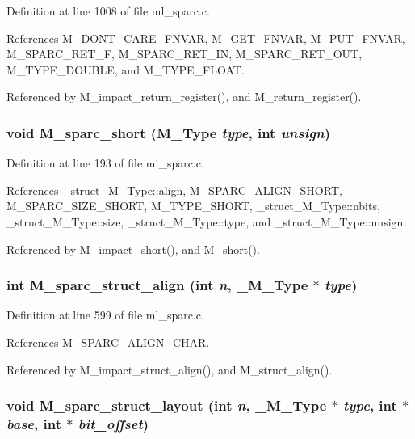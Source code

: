 Definition at line 1008 of file ml\_\-sparc.c.

References M\_\-DONT\_\-CARE\_\-FNVAR, M\_\-GET\_\-FNVAR, M\_\-PUT\_\-FNVAR, M\_\-SPARC\_\-RET\_\-F, M\_\-SPARC\_\-RET\_\-IN, M\_\-SPARC\_\-RET\_\-OUT, M\_\-TYPE\_\-DOUBLE, and M\_\-TYPE\_\-FLOAT.

Referenced by M\_\-impact\_\-return\_\-register(), and M\_\-return\_\-register().
\subsubsection{\setlength{\rightskip}{0pt plus 5cm}void M\_\-sparc\_\-short (\bf{M\_\-Type} {\em type}, int {\em unsign})}\label{m__sparc_8h_a546df12ac7074d2ad2c38f89eab877a}




Definition at line 193 of file mi\_\-sparc.c.

References \_\-struct\_\-M\_\-Type::align, M\_\-SPARC\_\-ALIGN\_\-SHORT, M\_\-SPARC\_\-SIZE\_\-SHORT, M\_\-TYPE\_\-SHORT, \_\-struct\_\-M\_\-Type::nbits, \_\-struct\_\-M\_\-Type::size, \_\-struct\_\-M\_\-Type::type, and \_\-struct\_\-M\_\-Type::unsign.

Referenced by M\_\-impact\_\-short(), and M\_\-short().
\subsubsection{\setlength{\rightskip}{0pt plus 5cm}int M\_\-sparc\_\-struct\_\-align (int {\em n}, \bf{\_\-M\_\-Type} $\ast$ {\em type})}\label{m__sparc_8h_c9dd4fff1abb70ca0f5e44c04bfec38b}




Definition at line 599 of file ml\_\-sparc.c.

References M\_\-SPARC\_\-ALIGN\_\-CHAR.

Referenced by M\_\-impact\_\-struct\_\-align(), and M\_\-struct\_\-align().
\subsubsection{\setlength{\rightskip}{0pt plus 5cm}void M\_\-sparc\_\-struct\_\-layout (int {\em n}, \bf{\_\-M\_\-Type} $\ast$ {\em type}, int $\ast$ {\em base}, int $\ast$ {\em bit\_\-offset})}\label{m__sparc_8h_9ae9119fcdd7f6449761eb24d336500a}




